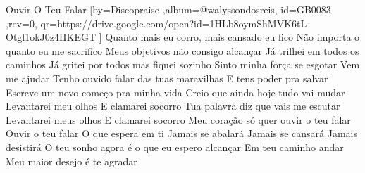 \beginsong
{Ouvir O Teu Falar %
}[by={Discopraise %
},album={@walyssondosreis},
id={GB0083 %
},rev={0}, %
qr={https://drive.google.com/open?id=1HLb8oymShMVK6tL-Otgl1okJ0z4HKEGT %
}]
\beginverse*
Quanto mais eu corro, mais cansado eu fico
Não importa o quanto eu me sacrifico
Meus objetivos não consigo alcançar
Já trilhei em todos os caminhos
Já gritei por todos mas fiquei sozinho
Sinto minha força se esgotar
Vem me ajudar
\endverse
\beginverse*
Tenho ouvido falar das tuas maravilhas
E tens poder pra salvar
Escreve um novo começo pra minha vida
Creio que ainda hoje tudo vai mudar
\endverse
\beginchorus
Levantarei meu olhos
E clamarei socorro
Tua palavra diz que vais me escutar
Levantarei meus olhos
E clamarei socorro
Meu coração só quer ouvir o teu falar
Ouvir o teu falar
\endchorus
\beginverse*
O que espera em ti
Jamais se abalará
Jamais se cansará
Jamais desistirá
O teu sonho agora é o que eu espero alcançar
Em teu caminho andar
Meu maior desejo é te agradar
\endverse

